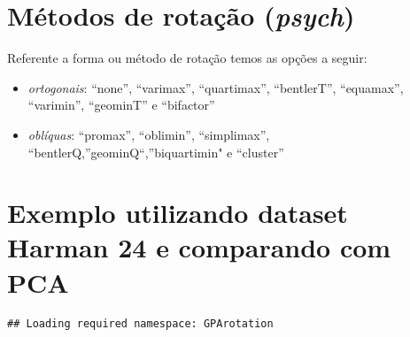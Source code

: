 \documentclass[]{book}
\newenvironment{Shaded}{\begin{snugshade}}{\end{snugshade}}
\newcommand{\KeywordTok}[1]{\textcolor[rgb]{0.13,0.29,0.53}{\textbf{{#1}}}}
\newcommand{\DataTypeTok}[1]{\textcolor[rgb]{0.13,0.29,0.53}{{#1}}}
\newcommand{\DecValTok}[1]{\textcolor[rgb]{0.00,0.00,0.81}{{#1}}}
\newcommand{\StringTok}[1]{\textcolor[rgb]{0.31,0.60,0.02}{{#1}}}
\newcommand{\CommentTok}[1]{\textcolor[rgb]{0.56,0.35,0.01}{\textit{{#1}}}}
\newcommand{\NormalTok}[1]{{#1}}
\providecommand{\tightlist}{%
  \setlength{\itemsep}{0pt}\setlength{\parskip}{0pt}}
\begin{document}
\section{\texorpdfstring{Métodos de rotação
(\emph{psych})}{Métodos de rotação (psych)}}\label{metodos-de-rotacao-psych}

Referente a forma ou método de rotação temos as opções a seguir:

\begin{itemize}
\tightlist
\item
  \emph{ortogonais}: ``none'', ``varimax'', ``quartimax'', ``bentlerT'',
  ``equamax'', ``varimin'', ``geominT'' e ``bifactor''
\item
  \emph{oblíquas}: ``promax'', ``oblimin'', ``simplimax'',
  ``bentlerQ,''geominQ``,''biquartimin" e ``cluster''
\end{itemize}

\section{Exemplo utilizando dataset Harman 24 e comparando com
PCA}\label{exemplo-utilizando-dataset-harman-24-e-comparando-com-pca}

\begin{Shaded}
\end{Shaded}

\begin{verbatim}
## Loading required namespace: GPArotation
\end{verbatim}
\end{document}
